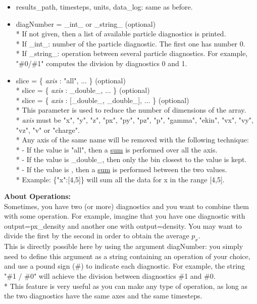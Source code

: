 \documentclass[11pt]{article}
\newcommand{\code}[1]{\colorbox{yellow!15}{\ttfamily #1}}
\newcommand{\val}[1]{{\ttfamily \textit{#1}}}
\begin{document}
\begin{itemize}
\item \code{results\_path}, \code{timesteps}, \code{units}, \code{data\_log}: same as before.
\item \code{diagNumber} = \code{\_int\_} or  \code{\_string\_} (optional)\\*
	If not given, then a list of available particle diagnostics is printed.\\*
	If \code{\_int\_}: number of the particle diagnostic. The first one has number 0.\\*
	If \code{\_string\_}: operation between several particle diagnostics.
	For example, \code{"\#0/\#1"} computes the division by diagnostics 0 and 1.
\item \code{slice} = \code{\{ \val{axis} : "all", ... \}}                 (optional)\\*
	\code{slice} = \code{\{ \val{axis} : \_double\_, ... \}}              (optional)\\*
	\code{slice} = \code{\{ \val{axis} : [\_double\_, \_double\_], ... \}}  (optional)\\*
	This parameter is used to reduce the number of dimensions of the array.\\*
	\val{axis} must be \code{"x"}, \code{"y"}, \code{"z"}, \code{"px"}, \code{"py"}, \code{"pz"}, \code{"p"},
	 \code{"gamma"}, \code{"ekin"}, \code{"vx"}, \code{"vy"}, \code{"vz"}, \code{"v"} or \code{"charge"}.\\*
	 Any axis of the same name will be removed with the following technique:\\*
	- If the value is \code{"all"}, then a \underline{sum} is performed over all the axis.\\*
	- If the value is \code{\_double\_}, then only the bin closest to the value is kept.\\*
	- If the value is \code{[\_double\_,\_double\_]}, then a \underline{sum} is performed between the two values.\\*
	Example: \code{\{"x":[4,5]\}} will sum all the data for x in the range [4,5].
\end{itemize}
\vspace{0.5cm}

\textbf{About Operations:}\\
Sometimes, you have two (or more) diagnostics and you want to combine them with some operation.
For example, imagine that you have one diagnostic with \code{output=px\_density} and another one with \code{output=density}.
You may want to divide the first by the second in order to obtain the average $p_x$.\\
This is directly possible here by using the argument \code{diagNumber}: you simply need to define this argument
as a string containing an operation of your choice, and use a pound sign (\#) to indicate each diagnostic. For example,
the string \code{"\#1 / \#0"} will achieve the division between diagnostics \#1 and \#0.\\*
This feature is very useful as you can make any type of operation, as long as the two diagnostics have the same axes
and the same timesteps.\\
\end{document}
